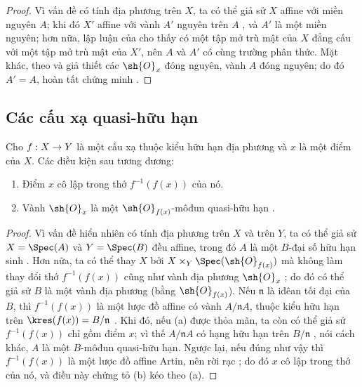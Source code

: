 \documentclass[oneside,10pt]{amsart}
\makeatletter
\newcommand{\ega@arrow}[2]{\mathchoice{#1}{#2}{#2}{#2}}
\renewcommand{\to}{\ega@arrow{\longrightarrow}{\rightarrow}}
\newcommand{\oldpage}[2][]{\marginnote{\normalfont\footnotesize\textbf{#1}~|~#2}\ignorespaces}
\let\EGAOriginalLabel\label
\renewcommand{\label}[1]{\phantomsection\EGAOriginalLabel{#1}}
\makeatother
\begin{document}
\begin{proof}
Vì vấn đề có tính địa phương trên $X$, ta có thể giả sử $X$ affine với miền nguyên $A$; khi đó $X'$ affine với vành $A'$ nguyên trên $A$ , và $A'$ là một miền nguyên;
hơn nữa, lập luận của  cho thấy có một tập mở trù mật của $X$ đẳng cấu với một tập mở trù mật của $X'$, nên $A$ và $A'$ có cùng trường phân thức.
Mặt khác, theo  và giả thiết các $\sh{O}_x$ đóng nguyên, vành $A$ đóng nguyên;
do đó $A'=A$, hoàn tất chứng minh .
\end{proof}

\subsection{Các cấu xạ quasi-hữu hạn}
\label{subsection:II.6.2}

\begin{proposition}[6.2.1]
\label{II.6.2.1}
Cho $f:X\to Y$ là một cấu xạ thuộc kiểu hữu hạn địa phương và $x$ là một điểm của $X$.
Các điều kiện sau tương đương:
\oldpage[II]{115}
\begin{enumerate}
  \item[\rm{(a)}] Điểm $x$ cô lập trong thớ $f^{-1}(f(x))$ của nó.
  \item[\rm{(b)}] Vành $\sh{O}_x$ là một $\sh{O}_{f(x)}$-môđun quasi-hữu hạn .
\end{enumerate}
\end{proposition}

\begin{proof}
Vì vấn đề hiển nhiên có tính địa phương trên $X$ và trên $Y$, ta có thể giả sử $X=\Spec(A)$ và $Y=\Spec(B)$ đều affine, trong đó $A$ là một $B$-đại số hữu hạn sinh .
Hơn nữa, ta có thể thay $X$ bởi $X\times_Y\Spec(\sh{O}_{f(x)})$ mà không làm thay đổi thớ $f^{-1}(f(x))$ cũng như vành địa phương $\sh{O}_x$ ;
do đó có thể giả sử $B$ là một vành địa phương (bằng $\sh{O}_{f(x)}$).
Nếu $\mathfrak{n}$ là iđêan tối đại của $B$, thì $f^{-1}(f(x))$ là một lược đồ affine có vành $A/\mathfrak{n}A$, thuộc kiểu hữu hạn trên $\kres(f(x))=B/\mathfrak{n}$ .
Khi đó, nếu (a) được thỏa mãn, ta còn có thể giả sử $f^{-1}(f(x))$ chỉ gồm điểm $x$;
vì thế $A/\mathfrak{n}A$ có hạng hữu hạn trên $B/\mathfrak{n}$ , nói cách khác, $A$ là một $B$-môđun quasi-hữu hạn.
Ngược lại, nếu đúng như vậy thì $f^{-1}(f(x))$ là một lược đồ affine Artin, nên rời rạc ;
do đó $x$ cô lập trong thớ của nó, và điều này chứng tỏ (b) kéo theo (a).
\end{proof}
\end{document}
